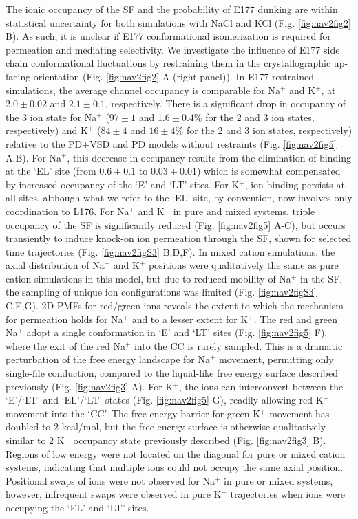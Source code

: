 \begin{refsection}
The ionic occupancy of the SF and the probability of E177 dunking are within statistical uncertainty for both simulations with NaCl and KCl (Fig. \ref{fig:nav2fig2} B). As such, it is unclear if E177 conformational isomerization is required for permeation and mediating selectivity. We investigate the influence of E177 side chain conformational fluctuations by restraining them in the crystallographic up-facing orientation (Fig. \ref{fig:nav2fig2} A (right panel)). In E177 restrained simulations, the average channel occupancy is comparable for Na$^+$ and K$^+$, at $2.0\pm0.02$ and $2.1\pm0.1$, respectively. There is a significant drop in occupancy of the 3 ion state for Na$^+$ ($97\pm1$ and $1.6\pm0.4$\% for the 2 and 3 ion states, respectively) and K$^+$ ($84\pm4$ and $16\pm4$\% for the 2 and 3 ion states, respectively) relative to the PD+VSD and PD models without restraints (Fig. \ref{fig:nav2fig5} A,B). For Na$^+$, this decrease in occupancy results from the elimination of binding at the `EL' site (from $0.6\pm0.1$ to $0.03\pm0.01$) which is somewhat compensated by increased occupancy of the `E' and `LT' sites. For K$^+$, ion binding persists at all sites, although what we refer to the `EL' site, by convention, now involves only coordination to L176. For Na$^+$ and K$^+$ in pure and mixed systems, triple occupancy of the SF is significantly reduced (Fig. \ref{fig:nav2fig5} A-C), but occurs transiently to induce knock-on ion permeation through the SF, shown for selected time trajectories (Fig. \ref{fig:nav2figS3} B,D,F). In mixed cation simulations, the axial distribution of Na$^+$ and K$^+$ positions were qualitatively the same as pure cation simulations in this model, but due to reduced mobility of Na$^+$ in the SF, the sampling of unique ion configurations was limited (Fig. \ref{fig:nav2figS3} C,E,G). 
2D PMFs for red/green ions reveals the extent to which the mechanism for permeation holds for Na$^+$ and to a lesser extent for K$^+$. The red and green Na$^+$ adopt a single conformation in `E' and `LT' sites (Fig. \ref{fig:nav2fig5} F), where the exit of the red Na$^+$ into the CC is rarely sampled. This is a dramatic perturbation of the free energy landscape for Na$^+$ movement, permitting only single-file conduction, compared to the liquid-like free energy surface described previously (Fig. \ref{fig:nav2fig3} A). For K$^+$, the ions can interconvert between the `E'/`LT' and `EL'/`LT' states (Fig. \ref{fig:nav2fig5} G), readily allowing red K$^+$ movement into the `CC'. The free energy barrier for green K$^+$ movement has doubled to 2 kcal/mol, but the free energy surface is otherwise qualitatively similar to 2 K$^+$ occupancy state previously described (Fig. \ref{fig:nav2fig3} B). Regions of low energy were not located on the diagonal for pure or mixed cation systems, indicating that multiple ions could not occupy the same axial position. Positional swaps of ions were not observed for Na$^+$ in pure or mixed systems, however, infrequent swaps were observed in pure K$^+$ trajectories when ions were occupying the `EL' and `LT' sites. 


\end{refsection}
